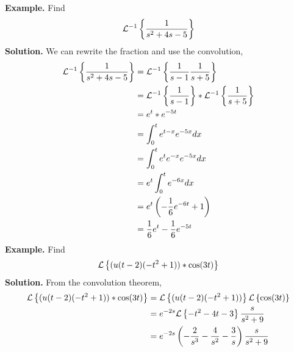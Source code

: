 \documentclass[openany]{report}
\begin{document}
\textbf{Example.} Find 
\[\mathcal{L}^{-1}\left\{\frac{1}{s^2 + 4s - 5}\right\}\]
\textbf{Solution.} We can rewrite the fraction and use the convolution, 
\begin{align*}
    \mathcal{L}^{-1}\left\{\frac{1}{s^2 + 4s - 5}\right\} &= \mathcal{L}^{-1}\left\{\frac{1}{s-1} \frac{1}{s+5}\right\} \\
    &= \mathcal{L}^{-1}\left\{\frac{1}{s-1}\right\} * \mathcal{L}^{-1}\left\{\frac{1}{s+5}\right\}\\
    &= e^{t} * e^{-5t}\\
    &= \int_0^t e^{t-x}e^{-5x}dx\\
    &= \int_0^t e^{t}e^{-x}e^{-5x}dx\\
    &= e^t \int_0^t e^{-6x}dx\\
    &= e^t\left(-\frac{1}{6}e^{-6t} + 1\right)\\
    &= \frac{1}{6}e^t - \frac{1}{6}e^{-5t}
\end{align*}
\noindent
\textbf{Example.} Find 
\[\mathcal{L}\left\{(u(t-2)(-t^2+1))*\cos(3t)\right\}\]
\textbf{Solution.} From the convolution theorem, 
\begin{align*}
    \mathcal{L}\left\{(u(t-2)(-t^2+1))*\cos(3t)\right\} &= \mathcal{L}\left\{(u(t-2)(-t^2+1))\right\}\mathcal{L}\left\{\cos(3t)\right\}\\
    &= e^{-2s}\mathcal{L}\left\{-t^2-4t-3\right\}\frac{s}{s^2+9}\\
    &= e^{-2s}\left(-\frac{2}{s^3} - \frac{4}{s^2} - \frac{3}{s}\right)\frac{s}{s^2+9}
\end{align*}
\end{document}
